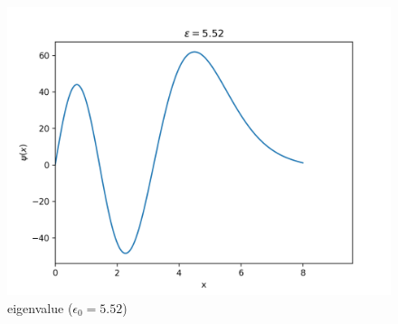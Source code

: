 \documentclass[11pt, a4paper, reqno]{scrartcl}
\begin{document}
    	\begin{figure}[H]
    			\includegraphics[width=.3\paperwidth]{plot_5_52.png}  		
    			\caption{eigenvalue ($\epsilon_0 = 5.52$)}
    	\end{figure}
    	
    		
\end{document}
